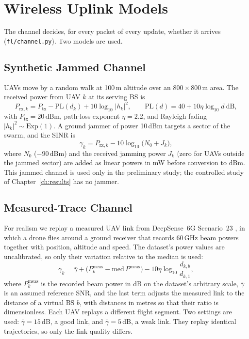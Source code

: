 \section{Wireless Uplink Models}
\label{sec:channel}
The channel decides, for every packet of every update, whether it arrives
(\texttt{fl/channel.py}). Two models are used.

\subsection{Synthetic Jammed Channel}
UAVs move by a random walk at 100\,m altitude over an $800\times800$\,m area. The
received power from UAV $k$ at its serving BS is
\begin{equation}
  P_{\mathrm{rx},k} = P_{\mathrm{tx}} - \mathrm{PL}(d_k) + 10\log_{10}|h_k|^2,
  \qquad \mathrm{PL}(d)=40+10\eta\log_{10}d \ \text{dB},
\end{equation}
with $P_{\mathrm{tx}}=20$\,dBm, path-loss exponent $\eta=2.2$, and Rayleigh fading
$|h_k|^2\sim\mathrm{Exp}(1)$. A ground jammer of power 10\,dBm targets a sector of
the swarm, and the SINR is
\begin{equation}
  \gamma_k = P_{\mathrm{rx},k} - 10\log_{10}\bigl(N_0 + J_k\bigr),
\end{equation}
where $N_0$ ($-90$\,dBm) and the received jamming power $J_k$ (zero for UAVs outside
the jammed sector) are added as linear powers in mW before conversion to dBm. This
jammed channel is used only in the preliminary study; the controlled study of
Chapter~\ref{ch:results} has no jammer.

\subsection{Measured-Trace Channel}
For realism we replay a measured UAV link from DeepSense~6G
Scenario~23 \cite{alkhateeb2023deepsense,charan2025drone}, in which a drone flies
around a ground receiver that records 60\,GHz beam powers together with position,
altitude and speed. The dataset's power values are uncalibrated, so only their
variation relative to the median is used:
\begin{equation}
  \gamma_k = \bar\gamma + \bigl(P^{\mathrm{meas}}_k - \mathrm{med}\,P^{\mathrm{meas}}\bigr)
  - 10\eta\log_{10}\frac{d_{k,b}}{d_{k,1}},
\end{equation}
where $P^{\mathrm{meas}}_k$ is the recorded beam power in dB on the dataset's
arbitrary scale, $\bar\gamma$ is an assumed reference SNR, and the last term adjusts
the measured link to the distance of a virtual BS $b$, with distances in metres so
that their ratio is dimensionless. Each UAV replays a different flight
segment. Two settings are used: $\bar\gamma=15$\,dB, a good link, and
$\bar\gamma=5$\,dB, a weak link. They replay identical trajectories, so only the
link quality differs.

